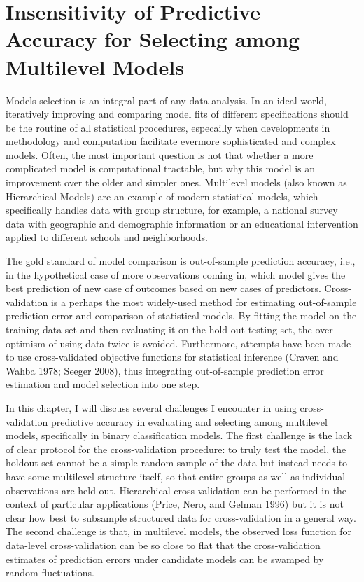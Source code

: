 \chapter{Insensitivity of Predictive Accuracy for Selecting among Multilevel
Models}


Models selection is an integral part of any data analysis. In an ideal
world, iteratively improving and comparing model fits of different
specifications should be the routine of all statistical procedures,
especailly when developments in methodology and computation facilitate
evermore sophisticated and complex models. Often, the most important
question is not that whether a more complicated model is computational
tractable, but why this model is an improvement over the older and
simpler ones. Multilevel models (also known as Hierarchical Models) are
an example of modern statistical models, which specifically handles data
with group structure, for example, a national survey data with
geographic and demographic information or an educational intervention
applied to different schools and neighborhoods.

The gold standard of model comparison is out-of-sample prediction
accuracy, i.e., in the hypothetical case of more observations coming in,
which model gives the best prediction of new case of outcomes based on
new cases of predictors. Cross-validation is a perhaps the most
widely-used method for estimating out-of-sample prediction error and
comparison of statistical models. By fitting the model on the training
data set and then evaluating it on the hold-out testing set, the
over-optimism of using data twice is avoided. Furthermore, attempts have
been made to use cross-validated objective functions for statistical
inference (Craven and Wahba 1978; Seeger 2008), thus integrating
out-of-sample prediction error estimation and model selection into one
step.

In this chapter, I will discuss several challenges I encounter in using
cross-validation predictive accuracy in evaluating and selecting among
multilevel models, specifically in binary classification models. The
first challenge is the lack of clear protocol for the cross-validation
procedure: to truly test the model, the holdout set cannot be a simple
random sample of the data but instead needs to have some multilevel
structure itself, so that entire groups as well as individual
observations are held out. Hierarchical cross-validation can be
performed in the context of particular applications (Price, Nero, and
Gelman 1996) but it is not clear how best to subsample structured data
for cross-validation in a general way. The second challenge is that, in
multilevel models, the observed loss function for data-level
cross-validation can be so close to flat that the cross-validation
estimates of prediction errors under candidate models can be swamped by
random fluctuations.

